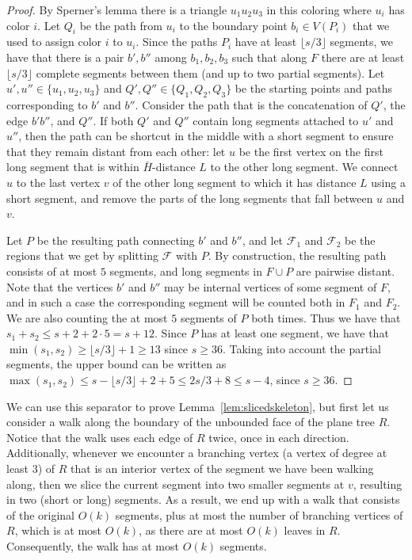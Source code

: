 \documentclass[a4paper,11pt]{article}
\newcommand{\calF}{\mathcal{F}}
\theoremstyle{plain}
\newtheorem{identification rule}{Identification Rule}
\theoremstyle{definition}
\theoremstyle{remark}
\begin{document}
\begin{proof}
By Sperner's lemma there is a triangle $u_1u_2u_3$ in this coloring where $u_i$ has color $i$. Let $Q_i$ be the path from $u_i$ to the boundary point $b_i\in V(P_i)$ that we used to assign color $i$ to $u_i$. Since the paths $P_i$ have at least $\lfloor s/3 \rfloor$ segments, we have that there is a pair $b',b''$ among $b_1,b_2,b_3$ such that  along $F$ there are at least $\lfloor s/3 \rfloor$ complete segments between them (and up to two partial segments). Let $u',u''\in \{u_1,u_2,u_3\}$ and $Q',Q''\in \{Q_1,Q_2,Q_3\}$ be the starting points and paths corresponding to $b'$ and $b''$. Consider the path that is the concatenation of $Q'$, the edge $b'b''$, and $Q''$. If both $Q'$ and $Q''$ contain long segments attached to $u'$ and $u''$, then the path can be shortcut in the middle with a short segment to ensure that they remain distant from each other: let $u$ be the first vertex on the first long segment that is within $\bar{H}$-distance $L$ to the other long segment. We connect $u$ to the last vertex $v$ of the other long segment to which it has distance $L$ using a short segment, and remove the parts of the long segments that fall between $u$ and $v$.

Let $P$ be the resulting path connecting $b'$ and $b''$, and let $\calF_1$ and $\calF_2$ be the regions that we get by splitting $\calF$ with $P$. By construction, the resulting path consists of at most $5$ segments, and long segments in $F\cup P$ are pairwise distant. Note that the vertices $b'$ and $b''$ may be internal vertices of some segment of $F$, and in such a case the corresponding segment will be counted both in $F_1$ and $F_2$. We are also counting the at most $5$ segments of $P$ both times. Thus we have that $s_1+s_2\leq s+2+2\cdot 5 = s+12$. Since $P$ has at least one segment, we have that $\min(s_1,s_2)\geq \lfloor s/3 \rfloor + 1\geq 13$ since $s\geq 36$. Taking into account the partial segments, the upper bound can be written as $\max(s_1,s_2)\leq s-\lfloor s/3 \rfloor + 2 + 5 \leq 2s/3 + 8\leq s-4$, since $s\geq 36$.
\end{proof}

We can use this separator to prove Lemma~\ref{lem:slicedskeleton}, but first let us consider a walk along the boundary of the unbounded face of the plane tree $R$. Notice that the walk uses each edge of $R$ twice, once in each direction. Additionally, whenever we encounter a branching vertex (a vertex of degree at least $3$) of $R$ that is an interior vertex of the segment we have been walking along, then we slice the current segment into two smaller segments at $v$, resulting in two (short or long) segments. As a result, we end up with a walk that consists of the original $O(k)$ segments, plus at most the number of branching vertices of $R$, which is at most $O(k)$, as there are at most $O(k)$ leaves in $R$. Consequently, the walk has at most $O(k)$ segments.
\end{document}
